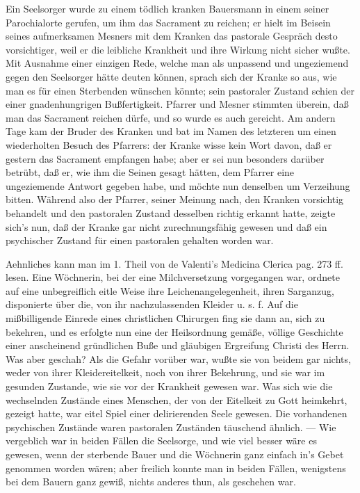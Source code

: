 Ein Seelsorger wurde zu einem tödlich kranken Bauersmann in einem seiner Parochialorte gerufen, um ihm das Sacrament zu reichen; er hielt im Beisein seines aufmerksamen Mesners mit dem Kranken das pastorale Gespräch desto vorsichtiger, weil er die leibliche Krankheit und ihre Wirkung nicht sicher wußte. Mit Ausnahme einer einzigen Rede, welche man als unpassend und ungeziemend gegen den Seelsorger hätte deuten können, sprach sich der Kranke so aus, wie man es für einen Sterbenden wünschen könnte; sein pastoraler Zustand schien der einer gnadenhungrigen Bußfertigkeit. Pfarrer und Mesner stimmten überein, daß man das Sacrament reichen dürfe, und so wurde es auch gereicht. Am andern Tage kam der Bruder des Kranken und bat im Namen des letzteren um einen wiederholten Besuch des Pfarrers: der Kranke wisse kein Wort davon, daß er gestern das Sacrament
empfangen habe; aber er sei nun besonders darüber betrübt, daß er, wie ihm die Seinen gesagt hätten, dem Pfarrer eine ungeziemende Antwort gegeben habe, und möchte nun denselben um Verzeihung bitten. Während also der Pfarrer, seiner Meinung nach, den Kranken vorsichtig behandelt und den pastoralen Zustand desselben richtig erkannt hatte, zeigte sich’s nun, daß der Kranke gar nicht zurechnungsfähig gewesen und daß ein psychischer Zustand für einen pastoralen gehalten worden war.

Aehnliches kann man im 1. Theil von de Valenti’s Medicina Clerica pag. 273 ff. lesen. Eine Wöchnerin, bei der eine Milchversetzung vorgegangen war, ordnete auf eine unbegreiflich eitle Weise ihre Leichenangelegenheit, ihren Sarganzug, disponierte über die, von ihr nachzulassenden Kleider u. s. f. Auf die mißbilligende Einrede eines christlichen Chirurgen fing sie dann an, sich zu bekehren, und es erfolgte nun eine der Heilsordnung gemäße, völlige Geschichte einer anscheinend gründlichen Buße und gläubigen Ergreifung Christi des Herrn. Was aber geschah? Als die Gefahr vorüber war, wußte sie von beidem gar nichts, weder von ihrer Kleidereitelkeit, noch von ihrer Bekehrung, und sie war im gesunden Zustande, wie sie vor der Krankheit gewesen war. Was sich wie die wechselnden Zustände eines Menschen, der von der Eitelkeit zu Gott heimkehrt, gezeigt hatte, war eitel Spiel einer delirierenden Seele gewesen. Die vorhandenen psychischen Zustände waren pastoralen Zuständen täuschend ähnlich. — Wie vergeblich war in beiden Fällen die Seelsorge, und wie
viel besser wäre es gewesen, wenn der sterbende Bauer und die Wöchnerin ganz einfach in's Gebet genommen worden wären; aber freilich konnte man in beiden Fällen, wenigstens bei dem Bauern ganz gewiß, nichts anderes thun, als geschehen war.

